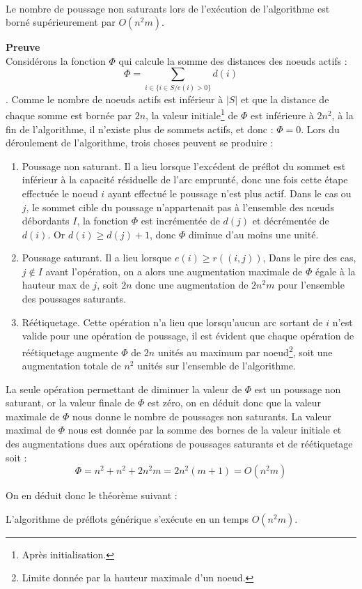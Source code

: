 \begin{lemma}~\\
	\label{borne_pns}
	Le nombre de poussage non saturants lors de l'exécution de l'algorithme est borné supérieurement
	par $O(n^2m)$.
\end{lemma}

\textbf{Preuve}\\
Considérons la fonction $\Phi$ qui calcule la somme des distances des noeuds actifs : $$
\Phi = \sum_{i \in \{i \in S / e(i) > 0\}} d(i)$$. Comme le nombre de noeuds actifs est inférieur à
$|S|$ et que la distance de chaque somme est bornée par $2n$, la valeur initiale\footnote{Après
initialisation.} de $\Phi$ est inférieure à $2n^2$, à la fin de l'algorithme, il n'existe plus de
sommets actifs, et donc : $\Phi = 0$.
Lors du déroulement de l'algorithme, trois choses peuvent se produire : \begin{enumerate}
	\item Poussage non saturant. Il a lieu lorsque l'excédent de préflot du sommet est inférieur à la
		capacité résiduelle de l'arc emprunté, donc une fois cette étape effectuée le noeud $i$ ayant
		effectué le poussage n'est plus actif. Dans le cas ou $j$, le sommet cible du poussage
		n'appartenait pas à l'ensemble des n\oe uds débordants $I$, la fonction $\Phi$ est incrémentée de 
		$d(j)$ et décrémentée de $d(i)$.  Or $d(i) \geq d(j) + 1$, donc $\Phi$ diminue d'au moins une
		unité.
	\item Poussage saturant. Il a lieu lorsque $e(i) \geq r((i,j))$, Dans le pire des cas, $j \not
		\in I$ avant l'opération, on a alors une augmentation maximale de $\Phi$ égale à la hauteur max
		de $j$, soit $2n$ donc une augmentation de $2n^2m$ pour l'ensemble des poussages saturants.
	\item Réétiquetage. Cette opération n'a lieu que lorsqu'aucun arc sortant de $i$ n'est valide
		pour une opération de poussage, il est évident que chaque opération de réétiquetage augmente
		$\Phi$ de $2n$ unités au maximum par noeud\footnote{Limite donnée par la hauteur maximale d'un
		noeud.}, soit une augmentation totale de $n^2$ unités sur l'ensemble de l'algorithme.
\end{enumerate}

La seule opération permettant de diminuer la valeur de $\Phi$ est un poussage non saturant, or la
valeur finale de $\Phi$ est zéro, on en déduit donc que la valeur maximale de $\Phi$ nous donne le
nombre de poussages non saturants. La valeur maximal de $\Phi$ nous est donnée par la somme des
bornes de la valeur initiale et des augmentations dues aux opérations de poussages saturants et de
réétiquetage soit : $$
\Phi = n^2 + n^2 + 2n^2m = 2n^2 (m + 1) = O(n^2m) $$

On en déduit donc le théorème suivant :
\begin{thrm}
	L'algorithme de préflots générique s'exécute en un temps $O(n^2m)$.
\end{thrm}


